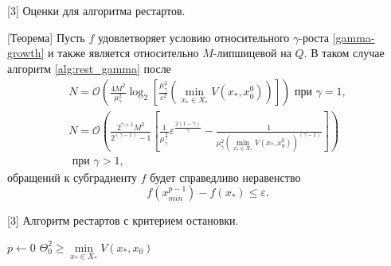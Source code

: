 \begin{frame} {[3] Оценки для алгоритма рестартов.}
\begin{block}{[Теорема]} \label{simple_restart}
    Пусть $f$ удовлетворяет условию относительного $\gamma$-роста \eqref{gamma-growth} и также является относительно $M$-липшицевой на $Q$. В таком случае алгоритм \ref{alg:rest_gamma} после 
    \begin{equation}
    \begin{aligned}
       N =\mathcal{O}\left(\frac{4 M^2}{\mu_{\gamma}^2} \log_2{\left[\frac{\mu_{\gamma}^2}{\varepsilon^2} \left(\min\limits_{x_* \in X_*}{V(x_*, x_0^0)}\right) \right]}\right) \text{ при } \gamma = 1, \\
       N = \mathcal{O}\left(\frac{2^{\gamma + 1} M^2}{2^{(\gamma - 1)} - 1}\left[\frac{1}{\mu_{\gamma}^{\frac{2}{\gamma}}} \varepsilon^{\frac{2(1 - \gamma)}{\gamma}}  - \frac{1}{\mu_{\gamma}^2 \left(\min\limits_{x_* \in X_*}{V(x_*, x_0^0)}\right)^{(\gamma - 1)}} \right]\right) \\
       \text{ при } \gamma > 1,
    \end{aligned}
    \end{equation}
    обращений к субградиенту $f$ будет справедливо неравенство
    \begin{equation}
        f(x_{min}^{p-1}) - f(x_*) \leq \varepsilon.
    \end{equation}
\end{block}
\end{frame}

\begin{frame} {[3] Алгоритм рестартов с критерием остановки.}
\begin{algorithm}[H]
    \label{alg:rest_criteria}
    \DontPrintSemicolon
    $p \gets 0$\;
    $\Theta_0^2 \geq \min\limits_{x_* \in X_*}{V(x_*,x_0)}$\;
\end{algorithm}
\end{frame}



